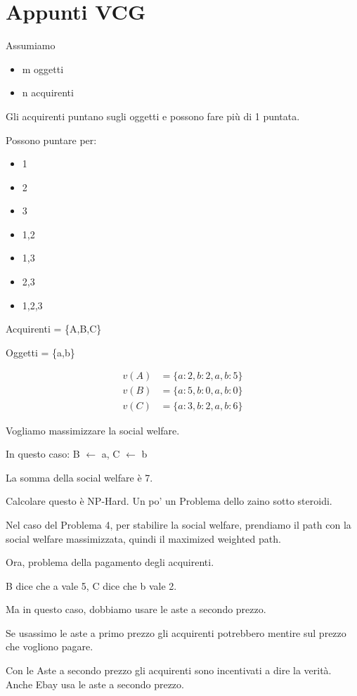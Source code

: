 \section{Appunti VCG}

Assumiamo
\begin{itemize}
\item m oggetti
\item n acquirenti
\end{itemize}

Gli acquirenti puntano sugli oggetti e possono fare più di 1 puntata.

Possono puntare per:
\begin{itemize}
\item 1
\item 2
\item 3
\item 1,2
\item 1,3
\item 2,3
\item 1,2,3
\end{itemize}

Acquirenti = \{A,B,C\}

Oggetti = \{a,b\}

\[
\begin{aligned}
v(A) &= \{a:2, b:2, a,b:5\}\\
v(B) &= \{a:5, b:0, a,b:0\}\\
v(C) &= \{a:3, b:2, a,b:6\}
\end{aligned}
\]

Vogliamo massimizzare la social welfare.

In questo caso: B $\leftarrow$ a, C $\leftarrow$ b  

La somma della social welfare è 7.

Calcolare questo è NP-Hard. Un po' un Problema dello zaino sotto steroidi.

Nel caso del Problema 4, per stabilire la social welfare, prendiamo il path con la social welfare massimizzata, quindi il maximized weighted path.

Ora, problema della pagamento degli acquirenti.

B dice che a vale 5, C dice che b vale 2.

Ma in questo caso, dobbiamo usare le aste a secondo prezzo.

Se usassimo le aste a primo prezzo gli acquirenti potrebbero mentire sul prezzo che vogliono pagare.

Con le Aste a secondo prezzo gli acquirenti sono incentivati a dire la verità. Anche Ebay usa le aste a secondo prezzo.

